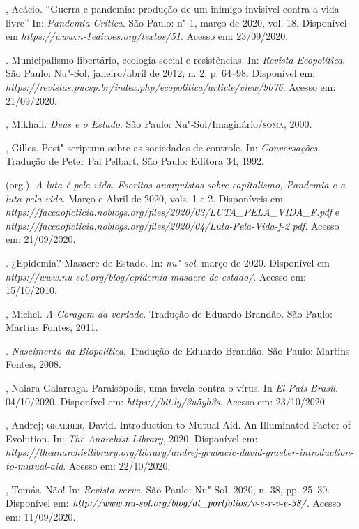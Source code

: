 \begin{bibliohedra}
, Acácio. ``Guerra e pandemia: produção de um inimigo invisível
contra a vida livre'' In: \emph{Pandemia Crítica}. São Paulo: n"-1, março
de 2020, vol. 18. Disponível em
\emph{https://www.n-1edicoes.org/textos/51}. Acesso em: 23/09/2020.

\titidem. Municipalismo libertário, ecologia social e resistências. In:
\emph{Revista Ecopolítica}. São Paulo: Nu"-Sol, janeiro/abril de 2012, n.
2, p. 64--98. Disponível em:
\emph{https://revistas.pucsp.br/index.php/ecopolitica/article/view/9076}.
Acesso em: 21/09/2020.

, Mikhail. \emph{Deus e o Estado}. São Paulo:
Nu"-Sol/Imaginário/\textsc{soma}, 2000.

, Gilles. Post"-scriptum sobre as sociedades de controle. In:
\emph{Conversações}. Tradução de Peter Pal Pelbart. São Paulo: Editora
34, 1992.

 (org.). \emph{A luta é pela vida. Escritos anarquistas
sobre capitalismo, Pandemia e a luta pela vida}. Março e Abril de 2020,
vols. 1 e 2. Disponíveis em
\emph{https://faccaoficticia.noblogs.org/files/2020/03/LUTA\_PELA\_VIDA\_F.pdf}
e
\emph{https://faccaoficticia.noblogs.org/files/2020/04/Luta-Pela-Vida-f-2.pdf}.
Acesso em: 21/09/2020.

. ¿Epidemia? Masacre de Estado. In:
\emph{nu"-sol}, março de 2020. Disponível em
\emph{https://www.nu-sol.org/blog/epidemia-masacre-de-estado/}. Acesso
em: 15/10/2010.

, Michel. \emph{A Coragem da verdade}. Tradução de Eduardo
Brandão. São Paulo: Martins Fontes, 2011.

\titidem. \emph{Nascimento da Biopolítica}. Tradução de Eduardo Brandão.
São Paulo: Martins Fontes, 2008.

, Naiara Galarraga. Paraisópolis, uma favela contra o vírus. In
\emph{El País Brasil}. 04/10/2020. Disponível em:
\emph{https://bit.ly/3u5yh3s}. Acesso em: 23/10/2020.

, Andrej; \textsc{graeber}, David. Introduction to Mutual Aid. An
Illuminated Factor of Evolution. In: \emph{The Anarchist Library}, 2020.
Disponível em:
\emph{https://theanarchistlibrary.org/library/andrej-grubacic-david-graeber-introduction-to-mutual-aid}.
Acesso em: 22/10/2020.

, Tomás. Não! In: \emph{Revista verve.} São Paulo: Nu"-Sol, 2020,
n. 38, pp. 25--30. Disponível em:
$\emph{http://www.nu-sol.org/blog/dt\_portfolios/v-e-r-v-e-38/}$. Acesso em:
11/09/2020.


\end{bibliohedra}
